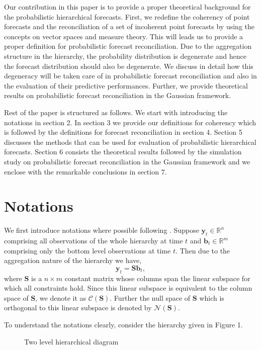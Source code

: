 \documentclass[a4paper, 11pt]{article}
\begin{document}
Our contribution in this paper is to provide a proper theoretical background for the probabilistic hierarchical forecasts. First, we redefine the coherency of point forecasts and the reconciliation of a set of incoherent point forecasts by using the concepts on vector spaces and measure theory. This will leads us to provide a proper definition for probabilistic forecast reconciliation. Due to the aggregation structure in the hierarchy, the probability distribution is degenerate and hence the forecast distribution should also be degenerate. We discuss in detail how this degeneracy will be taken care of in probabilistic forecast reconciliation and also in the evaluation of their predictive performances. Further, we provide theoretical results on probabilistic forecast reconciliation in the Gaussian framework.

Rest of the paper is structured as follows. We start with introducing the notations in section 2. In section 3 we provide our definitions for coherency which is followed by the definitions for forecast reconciliation in section 4. Section 5 discusses the methods that can be used for evaluation of probabilistic hierarchical forecasts. Section 6 consists the theoretical results followed by the simulation study on probabilistic forecast reconciliation in the Gaussian framework and we enclose with the remarkable conclusions in section 7.

\section{Notations}

We first introduce notations where possible following \citet{Wickramasuriya2017}. Suppose $\bm{y}_t \in \mathbb{R}^n$ comprising all observations of the whole hierarchy at time $t$ and $\bm{b}_t \in \mathbb{R}^m$ comprising only the bottom level observations at  time $t$. Then due to the aggregation nature of the hierarchy we have,
\begin{equation}
  \bm{y}_t = \bm{Sb}_t,
\end{equation}
where $\bm{S}$ is a $n \times m$ constant matrix whose columns span the linear subspace for which all constraints hold. Since this linear subspace is equivalent to the column space of $\bm{S}$, we denote it as $\mathscr{C}(\bm{S})$. Further the null space of $\bm{S}$ which is orthogonal to this linear subspace is denoted by $\mathscr{N}(\bm{S})$.

To understand the notations clearly, consider the hierarchy given in Figure 1.
\begin{figure}[H]
  \begin{center}
     
     
    \qobitree
  \end{center}
  \caption{Two level hierarchical diagram}
\end{figure}
\end{document}
